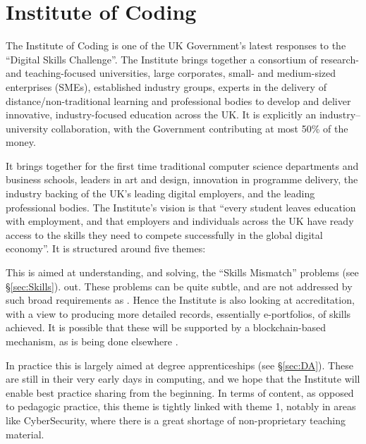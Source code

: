 \documentclass[sigconf]{acmart}
\begin{document}
\section{Institute of Coding}\label{ioc}

The Institute of Coding is one of the UK Government's
latest responses to the ``Digital Skills Challenge''. The Institute
brings together a consortium of research- and teaching-focused
universities, large corporates, small- and medium-sized enterprises
(SMEs), established industry groups, experts in the delivery of
distance/non-traditional learning and professional bodies to develop
and deliver innovative, industry-focused education across the UK. It
is explicitly an industry--university collaboration, with the
Government contributing at most 50\% of the money.

It brings together for the first time traditional computer science
departments and business schools, leaders in art and design,
innovation in programme delivery, the industry backing of the UK's
leading digital employers, and the leading professional bodies.  The
Institute's vision is that ``every student leaves education with
employment, and that employers and individuals across the UK have
ready access to the skills they need to compete successfully in the
global digital economy''. It is structured around five themes:\newline

 This is aimed at understanding, and
solving, the ``Skills Mismatch'' problems (see \S\ref{sec:Skills}).
out.  These problems can be quite subtle, and are not addressed by such
broad requirements as \cite[Requirement 2.3.1]{BCS2018a}.  Hence the
Institute is also looking at accreditation, with a view to producing
more detailed records, essentially e-portfolios, of skills
achieved. It is possible that these will be supported by a
blockchain-based mechanism, as is being done elsewhere
\cite{RMIT2018a}. \newline

 In practice this is largely aimed at
degree apprenticeships (see \S\ref{sec:DA}). These are still in their
very early days in computing, and we hope that the Institute will
enable best practice sharing from the beginning. In terms of content,
as opposed to pedagogic practice, this theme is tightly linked with
theme 1, notably in areas like CyberSecurity, where there is a great
shortage of non-proprietary teaching material.\newline
\end{document}
